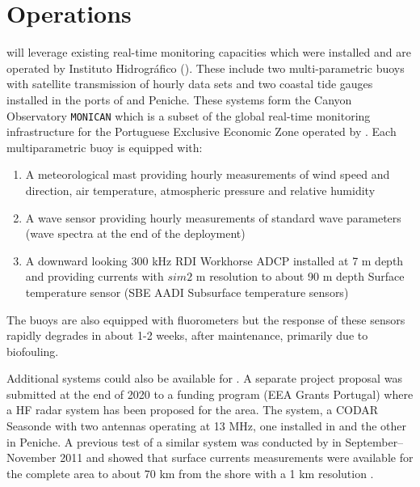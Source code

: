 \section{\proj Operations}
 

\proj will leverage existing real-time monitoring capacities which were
installed and are operated by Instituto Hidrogr\'{a}fico (\inste). These
include two multi-parametric buoys with satellite transmission of hourly
data sets and two coastal tide gauges installed in the ports of \naz and
Peniche. These systems form the \naz Canyon Observatory \texttt{MONICAN}
which is a subset of the global real-time monitoring infrastructure for
the Portuguese Exclusive Economic Zone operated by \inst {}. Each multiparametric buoy is equipped
with:

\begin{enumerate}

  \item A meteorological mast providing hourly measurements of wind speed and
    direction, air temperature, atmospheric pressure and relative
    humidity

  \item A wave sensor providing hourly measurements of standard wave parameters
    (wave spectra at the end of the deployment)

  \item A downward looking 300 kHz RDI Workhorse ADCP installed at 7 m
    depth and providing currents with $sim 2$ m resolution to about 90 m
    depth Surface temperature sensor (SBE AADI Subsurface temperature
    sensors)

\end{enumerate}  


The buoys are also equipped with fluorometers but the response of these
sensors rapidly degrades in about 1-2 weeks, after maintenance,
primarily due to biofouling.

Additional systems could also be available for \proje. A separate
project proposal was submitted at the end of 2020 to a funding program
(EEA Grants Portugal) where a HF radar system has been proposed for the
\naz area. The system, a CODAR Seasonde with two antennas operating at
13 MHz, one installed in \naz and the other in Peniche. A previous test
of a similar system was conducted by \inst in September--November 2011
and showed that surface currents measurements were available for the
complete area to about 70 km from the shore with a 1 km resolution
.
 
